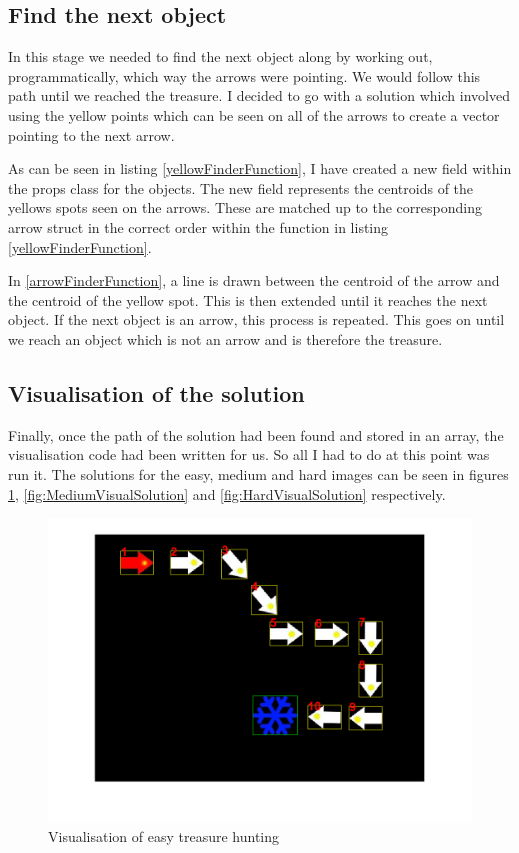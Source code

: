 \documentclass[11pt, letterpaper]{article}
\begin{document}
\subsection{Find the next object}
In this stage we needed to find the next object along by working out, programmatically, which way the arrows were pointing. We would follow this path until we reached the treasure. I decided to go with a solution which involved using the yellow points which can be seen on all of the arrows to create a vector pointing to the next arrow.

As can be seen in listing \ref{yellowFinderFunction}, I have created a new field within the props class for the objects. The new field represents the centroids of the yellows spots seen on the arrows. These are matched up to the corresponding arrow struct in the correct order within the function in listing \ref{yellowFinderFunction}. 

In \ref{arrowFinderFunction}, a line is drawn between the centroid of the arrow and the centroid of the yellow spot. This is then extended until it reaches the next object. If the next object is an arrow, this process is repeated. This goes on until we reach an object which is not an arrow and is therefore the treasure. 

\subsection{Visualisation of the solution}
Finally, once the path of the solution had been found and stored in an array, the visualisation code had been written for us. So all I had to do at this point was run it. The solutions for the easy, medium and hard images can be seen in figures \ref{fig:EasyVisualSolution}, \ref{fig:MediumVisualSolution} and \ref{fig:HardVisualSolution} respectively.

\begin{figure}[ht]
    \centering
    \includegraphics[width=0.75\linewidth]{Lab 4/EasyVisualSolution.png}
    \caption{Visualisation of easy treasure hunting}
    \label{fig:EasyVisualSolution}
\end{figure}
\end{document}
